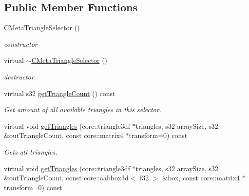 \subsection*{Public Member Functions}
\begin{DoxyCompactItemize}
\item 
\hypertarget{classirr_1_1scene_1_1_c_meta_triangle_selector_a05990e3d607f9657d66185314f401808}{\hyperlink{classirr_1_1scene_1_1_c_meta_triangle_selector_a05990e3d607f9657d66185314f401808}{C\-Meta\-Triangle\-Selector} ()}\label{classirr_1_1scene_1_1_c_meta_triangle_selector_a05990e3d607f9657d66185314f401808}

\begin{DoxyCompactList}\small\item\em constructor \end{DoxyCompactList}\item 
\hypertarget{classirr_1_1scene_1_1_c_meta_triangle_selector_ab4ed23ec84c7080a448c5f88930284f8}{virtual \hyperlink{classirr_1_1scene_1_1_c_meta_triangle_selector_ab4ed23ec84c7080a448c5f88930284f8}{$\sim$\-C\-Meta\-Triangle\-Selector} ()}\label{classirr_1_1scene_1_1_c_meta_triangle_selector_ab4ed23ec84c7080a448c5f88930284f8}

\begin{DoxyCompactList}\small\item\em destructor \end{DoxyCompactList}\item 
virtual s32 \hyperlink{classirr_1_1scene_1_1_c_meta_triangle_selector_a90e274fa42f4d060f5bb7d5102e1b7c1}{get\-Triangle\-Count} () const 
\begin{DoxyCompactList}\small\item\em Get amount of all available triangles in this selector. \end{DoxyCompactList}\item 
\hypertarget{classirr_1_1scene_1_1_c_meta_triangle_selector_af9abebf77fd05e784d02b432023fa6e9}{virtual void \hyperlink{classirr_1_1scene_1_1_c_meta_triangle_selector_af9abebf77fd05e784d02b432023fa6e9}{get\-Triangles} (core\-::triangle3df $\ast$triangles, s32 array\-Size, s32 \&out\-Triangle\-Count, const core\-::matrix4 $\ast$transform=0) const }\label{classirr_1_1scene_1_1_c_meta_triangle_selector_af9abebf77fd05e784d02b432023fa6e9}

\begin{DoxyCompactList}\small\item\em Gets all triangles. \end{DoxyCompactList}\item 
\hypertarget{classirr_1_1scene_1_1_c_meta_triangle_selector_a98dc9b3b2b10f7d2c18e56c6c66421d7}{virtual void \hyperlink{classirr_1_1scene_1_1_c_meta_triangle_selector_a98dc9b3b2b10f7d2c18e56c6c66421d7}{get\-Triangles} (core\-::triangle3df $\ast$triangles, s32 array\-Size, s32 \&out\-Triangle\-Count, const core\-::aabbox3d$<$ f32 $>$ \&box, const core\-::matrix4 $\ast$transform=0) const }\label{classirr_1_1scene_1_1_c_meta_triangle_selector_a98dc9b3b2b10f7d2c18e56c6c66421d7}


\end{DoxyCompactItemize}
